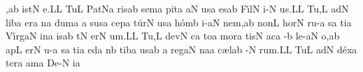 \sgn {}{\ae},\pes ab\egn
\spatium
{}i{st}\bivirga N\egn
\sgn {}e.\punctum L\augmentum L\egn
\spatium
\divisiofinalis
\spatium
\sgn Tu{}\punctum L\egn
\spatium
\sgn Pat\pes Na\egn
\sgn ris\punctum a\augmentum b\egn
\spatium
\divisiominima
\spatium
\sgn sem\punctum a\egn
\sgn pit\punctum a\egn
{}\clivis aN\egn
\sgn {}us\punctum a\egn
\spatium
\sgn {}es\pes ab\egn
\spatium
\sgn F{\'\i}l\punctum N\egn
\sgn {}i-\punctum N\egn
\sgn {}u{s.}\punctum L\augmentum L\egn
\spatium
\divisiofinalis
\spatium
\sgn Tu{,}\punctum L\egn
\spatium
\sgn {}ad\punctum N\egn
\spatium
\sgn lib\punctum a\egn
\sgn {}er\punctum a\egn
{}n\punctum a\egn
\sgn dum\punctum a\egn
\spatium
\custos a
\lineaproxima
\sgn sus\punctum a\egn
\sgn cep\punctum a\egn
\sgn t{\'u}r\punctum N\egn
\sgn {}us\punctum a\egn
\spatium
\sgn h{\'o}m\punctum b\egn
\sgn {}i-\clivis aN\egn
\sgn ne{m,}\punctum a\augmentum b\egn
\spatium
\divisiominima
\spatium
\sgn non\punctum L\egn
\spatium
\sgn hor\punctum N\egn
\sgn ru-\punctum a\egn
\sgn {}{\'\i}s\punctum a\egn
\sgn ti{}\punctum a\egn
\spatium
\sgn V{\'\i}{rg}\clivis aN\egn
\sgn {}in\punctum a\egn
\sgn {}is\pes ab\egn
\spatium
{}t\punctum N\egn
\sgn {}er\punctum N\egn
\sgn {}u{m.}\punctum L\augmentum L\egn
\spatium
\divisiofinalis
\spatium
\sgn Tu{,}\punctum L\egn
\spatium
\sgn dev\punctum N\egn
\sgn {}{\'\i}c\punctum a\egn
\sgn to{}\punctum a\egn
\spatium
\sgn mor\punctum a\egn
\sgn tis\punctum N\egn
\spatium
\sgn {}ac\punctum a\egn
{}-\punctum b\egn
\sgn le-\clivis aN\egn
\sgn {}o,\punctum a\augmentum b\egn
\spatium
\divisiominor
\spatium
\sgn {}ap\punctum L\egn
\sgn {}er\punctum N\egn
\sgn {}u-\punctum a\egn
\sgn {}{\'\i}s\punctum a\egn
\sgn ti{}\punctum a\egn
\spatium
{}ed\punctum a\egn
{}n\punctum b\egn
\sgn tib\punctum a\egn
\sgn {}us\punctum a\augmentum b\egn
\spatium
\divisiominima
\spatium
\custos a
\lineaproxima
\sgn reg\cephalicus aN\egn
\sgn na{}\punctum a\egn
\spatium
\sgn c{\ae}l\pes ab\egn
{}-\bivirga N\egn
\sgn ru{m.}\punctum L\augmentum L\egn
\spatium
\divisiofinalis
\spatium
\sgn Tu{}\punctum L\egn
\spatium
\sgn {}ad\punctum N\egn
\spatium
\sgn d{\'e}x\punctum a\egn
\sgn ter\punctum a\egn
\sgn {}am\punctum a\egn
\spatium
\sgn De-\punctum N\egn
\sgn {}i{}\punctum a\egn
